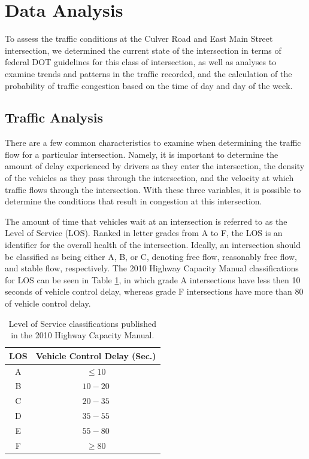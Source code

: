 \documentclass{report}
\begin{document}
\noindent
\section*{Data Analysis}

To assess the traffic conditions at the Culver Road and East Main Street
intersection, we determined the current state of the intersection in terms of
federal DOT guidelines for this class of intersection, as well as analyses to
examine trends and patterns in the traffic recorded, and the calculation of the
probability of traffic congestion based on the time of day and day of the week.


\subsection*{Traffic Analysis}

There are a few common characteristics to examine when determining the traffic
flow for a particular intersection. Namely, it is important to determine the
amount of delay experienced by drivers as they enter the intersection, the density
of the vehicles as they pass through the intersection, and the velocity at which
traffic flows through the intersection. With these three variables, it is possible
to determine the conditions that result in congestion at this intersection.

The amount of time that vehicles wait at an intersection is referred to as the
Level of Service (LOS). Ranked in letter grades from A to F, the LOS is an
identifier for the overall health of the intersection. Ideally, an intersection
should be classified as being either A, B, or C, denoting free flow, reasonably
free flow, and stable flow, respectively. The 2010 Highway Capacity
Manual classifications for LOS can be seen in Table \ref{LOStable}, in which grade
A intersections have less then 10 seconds of vehicle control delay, whereas grade
F intersections have more than 80 of vehicle control delay.

\begin{table}[h]
\centering
\caption{Level of Service classifications published in the 2010 Highway Capacity
Manual.}
\begin{tabular}{c | c}
\textbf{LOS} & \textbf{Vehicle Control Delay (Sec.)}\\\hline
A & $\le 10$\\
B & $10 - 20 $\\
C & $20 - 35$\\
D & $35 - 55$\\
E & $55 - 80$\\
F & $\ge 80$\\
\end{tabular}
\label{LOStable}
\end{table}
\end{document}
